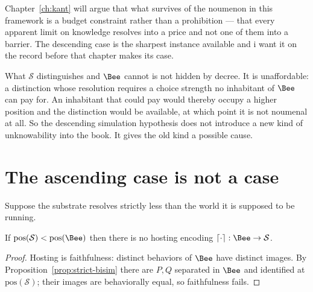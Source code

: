 \begin{remark}
\label{rmk:sim-noumenon}
Chapter~\ref{ch:kant} will argue that what survives of the noumenon in
this framework is a budget constraint rather than a prohibition --- that
every apparent limit on knowledge resolves into a price and not one of
them into a barrier.
The descending case is the sharpest instance available and i want it on
the record before that chapter makes its case.

What $\mathcal{S}$ distinguishes and $\Bee$ cannot is not hidden by
decree.
It is unaffordable: a distinction whose resolution requires a choice
strength no inhabitant of $\Bee$ can pay for.
An inhabitant that could pay would thereby occupy a higher position and
the distinction would be available, at which point it is not noumenal at
all.
So the descending simulation hypothesis does not introduce a new kind of
unknowability into the book.
It gives the old kind a possible cause.
\end{remark}

\section{The ascending case is not a case}
\label{sec:sim-ascend}

Suppose the substrate resolves strictly less than the world it is
supposed to be running.

\begin{proposition}
\label{prop:sim-noup}
If $\mathrm{pos}(\mathcal{S}) < \mathrm{pos}(\Bee)$ then there is no
hosting encoding $\lceil\cdot\rceil : \Bee \to \mathcal{S}$.
\end{proposition}

\begin{proof}
Hosting is faithfulness: distinct behaviors of $\Bee$ have distinct
images.
By Proposition~\ref{prop:strict-bisim} there are $P, Q$ separated in
$\Bee$ and identified at $\mathrm{pos}(\mathcal{S})$; their images are
behaviorally equal, so faithfulness fails.
\end{proof}

